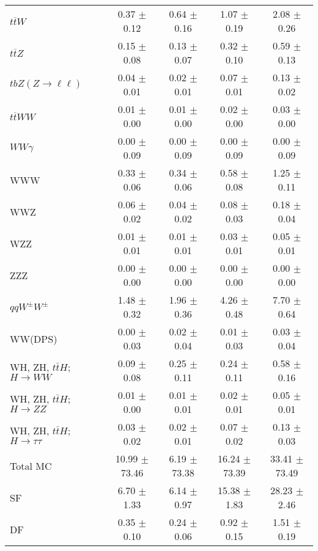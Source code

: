 \begin{tabular}{l|cccc}
                   $t\overline{t}W$ &  0.37 $\pm$  0.12 &  0.64 $\pm$  0.16 &  1.07 $\pm$  0.19 &  2.08 $\pm$  0.26 \\
                   $t\overline{t}Z$ &  0.15 $\pm$  0.08 &  0.13 $\pm$  0.07 &  0.32 $\pm$  0.10 &  0.59 $\pm$  0.13 \\
    $tbZ (Z \rightarrow \ell \ell)$ &  0.04 $\pm$  0.01 &  0.02 $\pm$  0.01 &  0.07 $\pm$  0.01 &  0.13 $\pm$  0.02 \\
                  $t\overline{t}WW$ &  0.01 $\pm$  0.00 &  0.01 $\pm$  0.00 &  0.02 $\pm$  0.00 &  0.03 $\pm$  0.00 \\
                         $WW\gamma$ &  0.00 $\pm$  0.09 &  0.00 $\pm$  0.09 &  0.00 $\pm$  0.09 &  0.00 $\pm$  0.09 \\
                                WWW &  0.33 $\pm$  0.06 &  0.34 $\pm$  0.06 &  0.58 $\pm$  0.08 &  1.25 $\pm$  0.11 \\
                                WWZ &  0.06 $\pm$  0.02 &  0.04 $\pm$  0.02 &  0.08 $\pm$  0.03 &  0.18 $\pm$  0.04 \\
                                WZZ &  0.01 $\pm$  0.01 &  0.01 $\pm$  0.01 &  0.03 $\pm$  0.01 &  0.05 $\pm$  0.01 \\
                                ZZZ &  0.00 $\pm$  0.00 &  0.00 $\pm$  0.00 &  0.00 $\pm$  0.00 &  0.00 $\pm$  0.00 \\
                 $qqW^{\pm}W^{\pm}$ &  1.48 $\pm$  0.32 &  1.96 $\pm$  0.36 &  4.26 $\pm$  0.48 &  7.70 $\pm$  0.64 \\
                            WW(DPS) &  0.00 $\pm$  0.03 &  0.02 $\pm$  0.04 &  0.01 $\pm$  0.03 &  0.03 $\pm$  0.04 \\
WH, ZH, $t\bar{t}H$; $H \rightarrow WW$ &  0.09 $\pm$  0.08 &  0.25 $\pm$  0.11 &  0.24 $\pm$  0.11 &  0.58 $\pm$  0.16 \\
WH, ZH, $t\bar{t}H$; $H \rightarrow ZZ$ &  0.01 $\pm$  0.00 &  0.01 $\pm$  0.01 &  0.02 $\pm$  0.01 &  0.05 $\pm$  0.01 \\
WH, ZH, $t\bar{t}H$; $H \rightarrow \tau\tau$ &  0.03 $\pm$  0.02 &  0.02 $\pm$  0.01 &  0.07 $\pm$  0.02 &  0.13 $\pm$  0.03 \\
\hline\hline
                           Total MC & 10.99 $\pm$ 73.46 &  6.19 $\pm$ 73.38 & 16.24 $\pm$ 73.39 & 33.41 $\pm$ 73.49 \\
\hline
                                 SF &  6.70 $\pm$  1.33 &  6.14 $\pm$  0.97 & 15.38 $\pm$  1.83 & 28.23 $\pm$  2.46 \\
                                 DF &  0.35 $\pm$  0.10 &  0.24 $\pm$  0.06 &  0.92 $\pm$  0.15 &  1.51 $\pm$  0.19 \\

\end{tabular}
